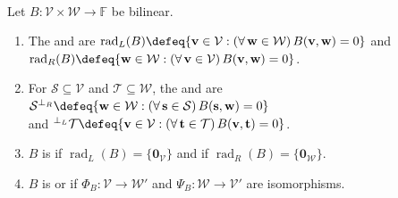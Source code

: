 \begin{definition} \label{def:bilinear-left-right-radicals} \\
Let $B:\mathcal{V}\times\mathcal{W}\to\mathbb{F}$ be bilinear.
\begin{enumerate}[label=(\roman*)]
\setlength{\itemsep}{0pt}
\item The  and  are $\operatorname{rad}_{L}(B)\defeq\{\mathbf{v}\in\mathcal{V}:(\forall\,\mathbf{w}\in\mathcal{W})\,B(\mathbf{v},\mathbf{w})=0\}$ and $\operatorname{rad}_{R}(B)\defeq\{\mathbf{w}\in\mathcal{W}:(\forall\,\mathbf{v}\in\mathcal{V})\,B(\mathbf{v},\mathbf{w})=0\}$.
\item For $\mathcal{S}\subseteq\mathcal{V}$ and $\mathcal{T}\subseteq\mathcal{W}$, the  and  are $\mathcal{S}^{\perp_R}\defeq\{\mathbf{w}\in\mathcal{W}:(\forall\,\mathbf{s}\in\mathcal{S})\,B(\mathbf{s},\mathbf{w})=0\}$\\
and ${}^{\perp_L}\mathcal{T}\defeq\{\mathbf{v}\in\mathcal{V}:(\forall\,\mathbf{t}\in\mathcal{T})\,B(\mathbf{v},\mathbf{t})=0\}$.
\item $B$ is  if $\operatorname{rad}_{L}(B)=\{\mathbf{0}_{\mathcal{V}}\}$ and  if $\operatorname{rad}_{R}(B)=\{\mathbf{0}_{\mathcal{W}}\}$.
\item $B$ is  or  if $\Phi_B:\mathcal{V}\to\mathcal{W}'$ and $\Psi_B:\mathcal{W}\to\mathcal{V}'$ are isomorphisms.
\end{enumerate}
\end{definition}

